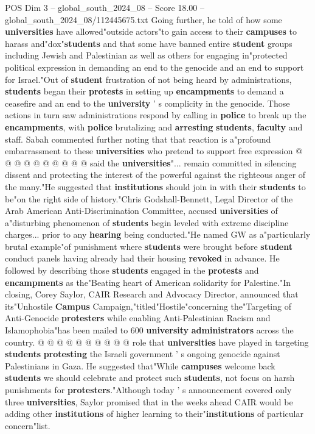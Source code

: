 \begin{textsample}{POS Dim 3 – global\_south\_2024\_08 – Score 18.00 – global\_south\_2024\_08/112445675.txt}
Going further, he told of how some \textbf{universities} have allowed"outside actors"to gain access to their \textbf{campuses} to harass and"dox"\textbf{students} and that some have banned entire \textbf{student} groups including Jewish and Palestinian as well as others for engaging in"protected political expression in demanding an end to the genocide and an end to support for Israel."Out of \textbf{student} frustration of not being heard by administrations, \textbf{students} began their \textbf{protests} in setting up \textbf{encampments} to demand a ceasefire and an end to the \textbf{university} ' s complicity in the genocide.
Those actions in turn saw administrations respond by calling in \textbf{police} to break up the \textbf{encampments}, with \textbf{police} brutalizing and \textbf{arresting} \textbf{students}, \textbf{faculty} and staff.
Sabah commented further noting that that reaction is a"profound embarrassment to these \textbf{universities} who pretend to support free expression @ @ @ @ @ @ @ @ @ @ said the \textbf{universities}"... remain committed in silencing dissent and protecting the interest of the powerful against the righteous anger of the many."He suggested that \textbf{institutions} should join in with their \textbf{students} to be"on the right side of history."Chris Godshall-Bennett, Legal Director of the Arab American Anti-Discrimination Committee, accused \textbf{universities} of a"disturbing phenomenon of \textbf{students} begin leveled with extreme discipline charges... prior to any \textbf{hearing} being conducted."He named GW as a"particularly brutal example"of punishment where \textbf{students} were brought before \textbf{student} conduct panels having already had their housing \textbf{revoked} in advance.
He followed by describing those \textbf{students} engaged in the \textbf{protests} and \textbf{encampments} as the"Beating heart of American solidarity for Palestine."In closing, Corey Saylor, CAIR Research and Advocacy Director, announced that its"Unhostile \textbf{Campus} Campaign,"titled"Hostile"concerning the"Targeting of Anti-Genocide \textbf{protesters} while enabling Anti-Palestinian Racism and Islamophobia"has been mailed to 600 \textbf{university} \textbf{administrators} across the country. @ @ @ @ @ @ @ @ @ @ role that \textbf{universities} have played in targeting \textbf{students} \textbf{protesting} the Israeli government ' s ongoing genocide against Palestinians in Gaza.
He suggested that"While \textbf{campuses} welcome back \textbf{students} we should celebrate and protect such \textbf{students}, not focus on harsh punishments for \textbf{protesters}."Although today ' s announcement covered only three \textbf{universities}, Saylor promised that in the weeks ahead CAIR would be adding other \textbf{institutions} of higher learning to their"\textbf{institutions} of particular concern"list.

\end{textsample}
